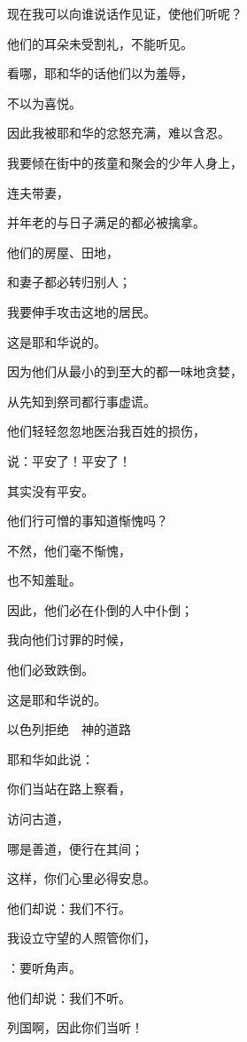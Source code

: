 {\par }{\Q {}现在我可以向谁说话作见证，使他们听呢？
\par }{\Q 他们的耳朵未受割礼，不能听见。
\par }{\Q 看哪，耶和华的话他们以为羞辱，
\par }{\Q 不以为喜悦。
\par }{\Q {}因此我被耶和华的忿怒充满，难以含忍。
\par }{\Q 我要倾在街中的孩童和聚会的少年人身上，
\par }{\Q 连夫带妻，
\par }{\Q 并年老的与日子满足的都必被擒拿。
\par }{\Q {}他们的房屋、田地，
\par }{\Q 和妻子都必转归别人；
\par }{\Q 我要伸手攻击这地的居民。
\par }{\Q 这是耶和华说的。
\par }{\Q {}因为他们从最小的到至大的都一味地贪婪，
\par }{\Q 从先知到祭司都行事虚谎。
\par }{\Q {}他们轻轻忽忽地医治我百姓的损伤，
\par }{\Q 说：平安了！平安了！
\par }{\Q 其实没有平安。
\par }{\Q {}他们行可憎的事知道惭愧吗？
\par }{\Q 不然，他们毫不惭愧，
\par }{\Q 也不知羞耻。
\par }{\Q 因此，他们必在仆倒的人中仆倒；
\par }{\Q 我向他们讨罪的时候，
\par }{\Q 他们必致跌倒。
\par }{\Q 这是耶和华说的。
\par }{\SH 以色列拒绝　神的道路
\par }{\Q {}耶和华如此说：
\par }{\Q 你们当站在路上察看，
\par }{\Q 访问古道，
\par }{\Q 哪是善道，便行在其间；
\par }{\Q 这样，你们心里必得安息。
\par }{\Q 他们却说：我们不行{}。
\par }{\Q {}我设立守望的人照管你们，
\par }{：要听角声。
\par }{\Q 他们却说：我们不听。
\par }{\Q {}列国啊，因此你们当听！
}
